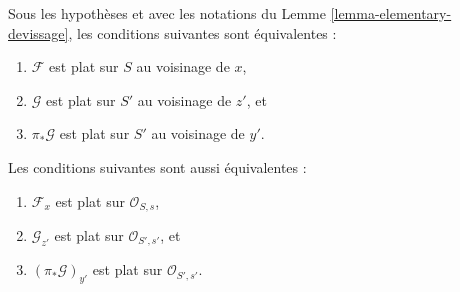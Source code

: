 \begin{lemma}
\label{lemma-devissage-flat}
Sous les hypothèses et avec les notations du
Lemme \ref{lemma-elementary-devissage},
les conditions suivantes sont équivalentes :
\begin{enumerate}
\item $\mathcal{F}$ est plat sur $S$ au voisinage de $x$,
\item $\mathcal{G}$ est plat sur $S'$ au voisinage de $z'$, et
\item $\pi_*\mathcal{G}$ est plat sur $S'$ au voisinage de $y'$.
\end{enumerate}
Les conditions suivantes sont aussi équivalentes :
\begin{enumerate}
\item[(a)] $\mathcal{F}_x$ est plat sur $\mathcal{O}_{S, s}$,
\item[(b)] $\mathcal{G}_{z'}$ est plat sur $\mathcal{O}_{S', s'}$, et
\item[(c)] $(\pi_*\mathcal{G})_{y'}$ est plat sur $\mathcal{O}_{S', s'}$.
\end{enumerate}
\end{lemma}

